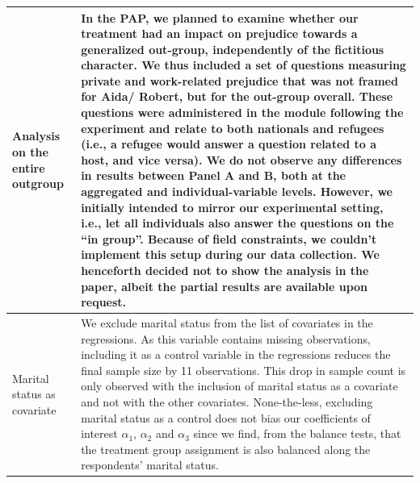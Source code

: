 \documentclass[a4paper,12pt]{article}
\begin{document}
\begin{appendix}
\begin{longtable}[c]{m{8em}m{12cm}}
    \hline
    Analysis on the entire outgroup & In the PAP, we planned to examine whether our treatment had an impact on prejudice towards a generalized out-group, independently of the fictitious character.  We thus included a set of questions measuring private and work-related prejudice that was not framed for Aida/ Robert, but for the out-group overall. These questions were administered in the module following the experiment and relate to both nationals and refugees (i.e., a refugee would answer a question related to a host, and vice versa). We do not observe any differences in results between Panel A and B, both at the aggregated and individual-variable levels. However, we initially intended to mirror our experimental setting, i.e., let all individuals also answer the questions on the ``in group''. Because of field constraints, we couldn't implement this setup during our data collection. We henceforth decided not to show the analysis in the paper, albeit the partial results are available upon request. \\
    \hline
    Marital status as covariate & We exclude marital status from the list of covariates in the regressions. As this variable contains missing observations, including it as a control variable in the regressions reduces the final sample size by 11 observations. This drop in sample count is only observed with the inclusion of marital status as a covariate and not with the other covariates. None-the-less, excluding marital status as a control does not bias our coefficients of interest $\alpha_1$, $\alpha_2$ and $\alpha_3$ since we find, from the balance tests, that the treatment group assignment is also balanced along the respondents' marital status.\\
    \hline
\end{longtable}


\end{appendix}
\end{document}
